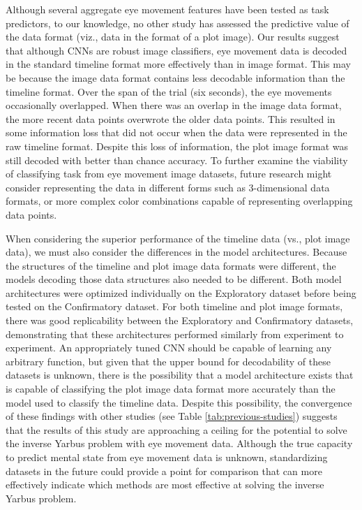 \documentclass[
  english,
  man, donotrepeattitle,floatsintext]{apa6}
\begin{document}
Although several aggregate eye movement features have been tested as task predictors, to our knowledge, no other study has assessed the predictive value of the data format (viz., data in the format of a plot image). Our results suggest that although CNNs are robust image classifiers, eye movement data is decoded in the standard timeline format more effectively than in image format. This may be because the image data format contains less decodable information than the timeline format. Over the span of the trial (six seconds), the eye movements occasionally overlapped. When there was an overlap in the image data format, the more recent data points overwrote the older data points. This resulted in some information loss that did not occur when the data were represented in the raw timeline format. Despite this loss of information, the plot image format was still decoded with better than chance accuracy. To further examine the viability of classifying task from eye movement image datasets, future research might consider representing the data in different forms such as 3-dimensional data formats, or more complex color combinations capable of representing overlapping data points.

When considering the superior performance of the timeline data (vs., plot image data), we must also consider the differences in the model architectures. Because the structures of the timeline and plot image data formats were different, the models decoding those data structures also needed to be different. Both model architectures were optimized individually on the Exploratory dataset before being tested on the Confirmatory dataset. For both timeline and plot image formats, there was good replicability between the Exploratory and Confirmatory datasets, demonstrating that these architectures performed similarly from experiment to experiment. An appropriately tuned CNN should be capable of learning any arbitrary function, but given that the upper bound for decodability of these datasets is unknown, there is the possibility that a model architecture exists that is capable of classifying the plot image data format more accurately than the model used to classify the timeline data. Despite this possibility, the convergence of these findings with other studies (see Table \ref{tab:previous-studies}) suggests that the results of this study are approaching a ceiling for the potential to solve the inverse Yarbus problem with eye movement data. Although the true capacity to predict mental state from eye movement data is unknown, standardizing datasets in the future could provide a point for comparison that can more effectively indicate which methods are most effective at solving the inverse Yarbus problem.
\end{document}
